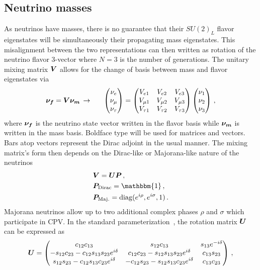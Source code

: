 \subsection{Neutrino masses}\label{sec:mix}
\noindent As neutrinos have masses, there is no guarantee that their $SU(2)_{L}$ flavor eigenstates will be simultaneously their propagating mass eigenstates. This misalignment between the two representations can then written as rotation of the neutrino flavor 3-vector where $N=3$ is the number of generations. The unitary mixing matrix $\boldsymbol{V}$ allows for the change of basis between mass and flavor eigenstates via
\begin{alignat}{1}
	\label{basis:1} \bb{\nu_{f}}=\bb{V}\bb{\nu_{m}}\,\rightarrow\indent
	\begin{pmatrix}
		\nu_{e}\\
		\nu_{\mu}\\
		\nu_{\tau}
	\end{pmatrix}=
	\begin{pmatrix}
		V_{e1} & V_{e2} & V_{e3}\\
		V_{\mu1} & V_{\mu2} & V_{\mu3}\\
		V_{\tau1} & V_{\tau2} & V_{\tau3}
	\end{pmatrix}
	\begin{pmatrix}
		\nu_{1}\\
		\nu_{2}\\
		\nu_{3}
	\end{pmatrix}\,,
\end{alignat}
where $\boldsymbol{\nu_{f}}$ is the neutrino state vector written in the flavor basis while $\boldsymbol{\nu_{m}}$ is written in the mass basis. Boldface type will be used for matrices and vectors. Bars atop vectors represent the Dirac adjoint in the usual manner. The mixing matrix's form then depends on the Dirac-like or Majorana-like nature of the neutrinos
\begin{alignat}{1}
	\label{phases:1} &\bb{V} = \bb{U}\bb{P}\,,\\
	\label{phases:2} &\bb{P}_{\rm Dirac} = \mathbbm{1}\,,\\
	\label{phases:3} &\bb{P}_{\rm Maj.} = {\rm diag}(e^{i\rho},e^{i\sigma},1)\,.
\end{alignat}
Majorana neutrinos allow up to two additional complex phases $\rho$ and $\sigma$ which participate in CPV. In the standard parameterization~\citep{schwartz2014quantum}, the rotation matrix $\boldsymbol{U}$ can be expressed as
\begin{alignat}{1}
	\label{rotation:1} \boldsymbol{U} =
	  \begin{pmatrix}
		  c_{12}c_{13} & s_{12}c_{13} & s_{13}e^{-i\delta}\\
		  -s_{12}c_{23} - c_{12}s_{13}s_{23}e^{i\delta} & c_{12}c_{23} - s_{12}s_{13}s_{23}e^{i\delta} & c_{13}s_{23}\\
		  s_{12}s_{23} - c_{12}s_{13}c_{23}e^{i\delta}& -c_{12}s_{23} - s_{12}s_{13}c_{23}e^{i\delta} & c_{13}c_{23}
	  \end{pmatrix}\,,
\end{alignat}
